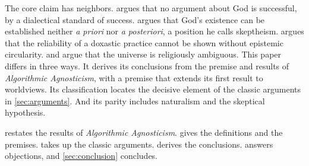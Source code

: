 The core claim has neighbors. \citet{oppy2006} argues that no argument about God is successful, by a
dialectical standard of success. \citet{mizrahi2017} argues that God's existence can be
established neither \emph{a priori} nor \emph{a posteriori}, a position he calls skeptheism.
\citet{alston1986} argues that the reliability of a doxastic practice cannot be shown without
epistemic circularity. \citet{hick1989} and \citet{mckim2001} argue that the universe is
religiously ambiguous. This paper differs in three ways. It derives its conclusions from the
premise and results of \emph{Algorithmic Agnosticism}, with a premise that extends its first result to worldviews. Its classification locates the
decisive element of the classic arguments in \cref{sec:arguments}. And its parity includes
naturalism and the skeptical hypothesis.

 restates the results of \emph{Algorithmic Agnosticism}.  gives the
definitions and the premises.  takes up the classic arguments.
 derives the conclusions.  answers objections, and
\cref{sec:conclusion} concludes.
